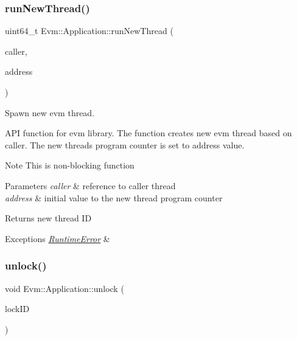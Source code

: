 \subsubsection{\texorpdfstring{run\+New\+Thread()}{runNewThread()}}
{\footnotesize\ttfamily uint64\+\_\+t Evm\+::\+Application\+::run\+New\+Thread (\begin{DoxyParamCaption}\item[{\mbox{\hyperlink{struct_evm_1_1_thread_context}{Thread\+Context}} \&}]{caller,  }\item[{uint32\+\_\+t}]{address }\end{DoxyParamCaption})}



Spawn new evm thread. 

A\+PI function for evm library. The function creates new evm thread based on caller. The new thread\textquotesingle{}s program counter is set to address value. \begin{DoxyNote}{Note}
This is non-\/blocking function 
\end{DoxyNote}

\begin{DoxyParams}{Parameters}
{\em caller} & reference to caller thread \\
\hline
{\em address} & initial value to the new thread program counter \\
\hline
\end{DoxyParams}
\begin{DoxyReturn}{Returns}
new thread ID 
\end{DoxyReturn}

\begin{DoxyExceptions}{Exceptions}
{\em \mbox{\hyperlink{struct_evm_1_1_runtime_error}{Runtime\+Error}}} & \\
\hline
\end{DoxyExceptions}
\mbox{\label{struct_evm_1_1_application_a1f1efb23d8d815d3b92b9a2f85b328f1}} 
\subsubsection{\texorpdfstring{unlock()}{unlock()}}
{\footnotesize\ttfamily void Evm\+::\+Application\+::unlock (\begin{DoxyParamCaption}\item[{uint64\+\_\+t}]{lock\+ID }\end{DoxyParamCaption})}



